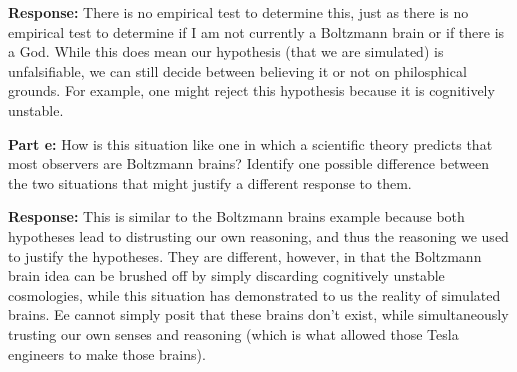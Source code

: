 \documentclass{article}
\begin{document}
\noindent\textbf{Response:} There is no empirical test to determine this, just as there is no empirical test to determine if I am not currently a Boltzmann brain or if there is a God. While this does mean our hypothesis (that we are simulated) is unfalsifiable, we can still decide between believing it or not on philosphical grounds. For example, one might reject this hypothesis because it is cognitively unstable.
\bigskip

\noindent\textbf{Part e:} How is this situation like one in which a scientific theory predicts that most observers are Boltzmann brains? Identify one possible difference between the two situations that might justify a different response to them.
\bigskip

\noindent\textbf{Response:} This is similar to the Boltzmann brains example because both hypotheses lead to distrusting our own reasoning, and thus the reasoning we used to justify the hypotheses. They are different, however, in that the Boltzmann brain idea can be brushed off by simply discarding cognitively unstable cosmologies, while this situation has demonstrated to us the reality of simulated brains. Ee cannot simply posit that these brains don't exist, while simultaneously trusting our own senses and reasoning (which is what allowed those Tesla engineers to make those brains).
\bigskip
\end{document}
